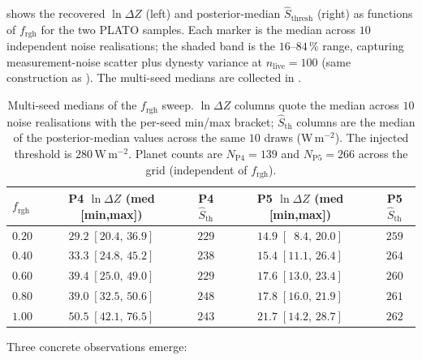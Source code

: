  shows the recovered $\ln\Delta Z$
(left) and posterior-median $\hat{S}_\mathrm{thresh}$ (right) as
functions of $f_\mathrm{rgh}$ for the two PLATO samples.  Each marker
is the median across $10$ independent noise realisations; the shaded
band is the $16$--$84\,\%$ range, capturing measurement-noise scatter
plus dynesty variance at $n_\mathrm{live}=100$ (same construction as
).  The multi-seed medians are collected in
.

\begin{table}[H]
    \centering
    \caption[Multi-seed medians of the $f_\mathrm{rgh}$ sweep]{%
        Multi-seed medians of the $f_\mathrm{rgh}$ sweep.  $\ln\Delta Z$
        columns quote the median across $10$ noise realisations with the
        per-seed min/max bracket; $\hat{S}_\mathrm{th}$ columns are the
        median of the posterior-median values across the same $10$ draws
        (W\,m$^{-2}$).  The injected threshold is $280\,\mathrm{W\,m^{-2}}$.
        Planet counts are $N_\mathrm{P4}=139$ and $N_\mathrm{P5}=266$
        across the grid (independent of $f_\mathrm{rgh}$).}
    \label{tab:frgh_sweep_results}
    \small
    \begin{tabular}{lcccc}
        \toprule
        $f_\mathrm{rgh}$ & P4 $\ln\Delta Z$ (med [min,max]) & P4 $\hat{S}_\mathrm{th}$
                         & P5 $\ln\Delta Z$ (med [min,max]) & P5 $\hat{S}_\mathrm{th}$ \\
        \midrule
        $0.20$ & $29.2\;[20.4,\,36.9]$ & $229$ & $14.9\;[\phantom{0}8.4,\,20.0]$ & $259$ \\
        $0.40$ & $33.3\;[24.8,\,45.2]$ & $238$ & $15.4\;[11.1,\,26.4]$           & $264$ \\
        $0.60$ & $39.4\;[25.0,\,49.0]$ & $229$ & $17.6\;[13.0,\,23.4]$           & $260$ \\
        $0.80$ & $39.0\;[32.5,\,50.6]$ & $248$ & $17.8\;[16.0,\,21.9]$           & $261$ \\
        $1.00$ & $50.5\;[42.1,\,76.5]$ & $243$ & $21.7\;[14.2,\,28.7]$           & $262$ \\
        \bottomrule
    \end{tabular}
\end{table}

Three concrete observations emerge:

